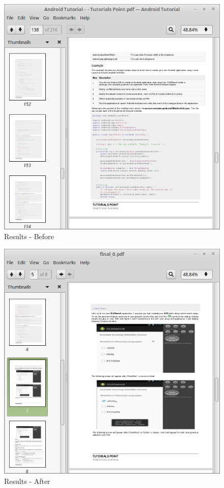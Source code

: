 \documentclass[oneside,a4paper,12pt]{report}
\begin{document}
{\begin{figure}[H]
\includegraphics{results-before}
\caption{Results - Before}
\end{figure}

\begin{figure}[H]
\includegraphics{results-after}
\caption{Results - After}
\end{figure}

}
\end{document}
